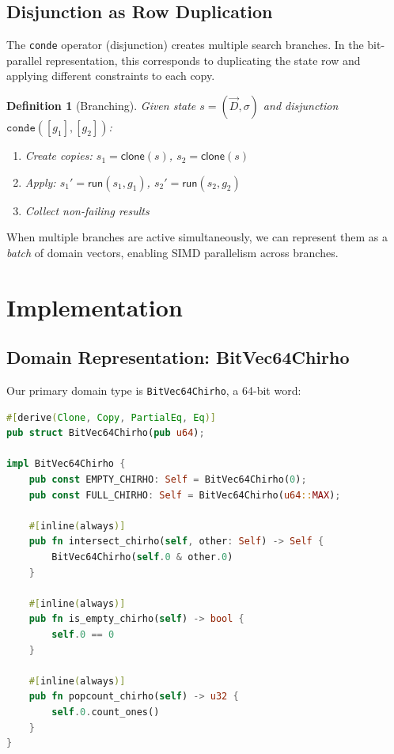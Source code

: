 \documentclass[11pt,a4paper]{article}
\newtheorem{definition}[theorem]{Definition}
\newcommand{\bitvec}{\texttt{BitVec64Chirho}\xspace}
\begin{document}
\subsection{Disjunction as Row Duplication}

The \texttt{conde} operator (disjunction) creates multiple search branches.
In the bit-parallel representation, this corresponds to duplicating the state row
and applying different constraints to each copy.

\begin{definition}[Branching]
Given state $s = (\vec{D}, \sigma)$ and disjunction $\texttt{conde}([g_1], [g_2])$:
\begin{enumerate}
  \item Create copies: $s_1 = \textsf{clone}(s)$, $s_2 = \textsf{clone}(s)$
  \item Apply: $s_1' = \textsf{run}(s_1, g_1)$, $s_2' = \textsf{run}(s_2, g_2)$
  \item Collect non-failing results
\end{enumerate}
\end{definition}

When multiple branches are active simultaneously, we can represent them as a \emph{batch}
of domain vectors, enabling SIMD parallelism across branches.

\section{Implementation}
\label{sec:impl}

\subsection{Domain Representation: BitVec64Chirho}

Our primary domain type is \bitvec, a 64-bit word:

\begin{lstlisting}[language=Rust]
#[derive(Clone, Copy, PartialEq, Eq)]
pub struct BitVec64Chirho(pub u64);

impl BitVec64Chirho {
    pub const EMPTY_CHIRHO: Self = BitVec64Chirho(0);
    pub const FULL_CHIRHO: Self = BitVec64Chirho(u64::MAX);

    #[inline(always)]
    pub fn intersect_chirho(self, other: Self) -> Self {
        BitVec64Chirho(self.0 & other.0)
    }

    #[inline(always)]
    pub fn is_empty_chirho(self) -> bool {
        self.0 == 0
    }

    #[inline(always)]
    pub fn popcount_chirho(self) -> u32 {
        self.0.count_ones()
    }
}
\end{lstlisting}
\end{document}
